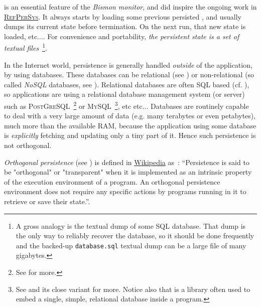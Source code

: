  is an essential feature of the
\emph{Bismon monitor}, and did inspire the ongoing work in
\href{http://refpersys.org/}{\textsc{RefPerSys}}.   It
always starts by loading some previous persisted ,
and usually dumps  its current state before
termination. On the next run, that new state is loaded, etc....  For
convenience and portability, \emph{the persistent state is a set of
  textual files}~\footnote{A gross analogy is the textual dump of some
  SQL database. That dump is the only way to reliably recover the
  database, so it should be done frequently and the backed-up
  \texttt{database.sql} textual dump can be a large file of many
  gigabytes.}.

In the Internet world, persistence is generally handled \emph{outside}
of the application, by using  databases. These
databases can be relational (see \cite{Date:2005:Database-in-Depth})
or non-relational (so called \emph{NoSQL} databases, see
\cite{RAJ-2018-NoSQL}). Relational databases are often SQL based
(cf. \cite{Date:2011:SQL-relth}), so applications are using a
relational database management system (or server) such as
\textsc{PostGreSQL}~\footnote{See  for
  more.} or \textsc{MySQL}~\footnote{See  and
  its close variant  for more. Notice also
  that  is a library often used to embed a
  single, simple, relational database inside a program.}, etc etc...
Databases are routinely capable to deal with a very large amount of
data (e.g. many terabytes or even petabytes), much more than the
available RAM, because the application using some database is
\emph{explicitly} fetching and updating only a tiny part of it. Hence
such persistence is not orthogonal.

\emph{Orthogonal persistence} 
 (see \cite{Dearle-2010-orthopersist})
is defined in
\href{https://en.wikipedia.org/wiki/Persistence\_(computer\_science)\#Orthogonal\_or\_transparent\_persistence}{Wikipedia} as~: ``Persistence is said to be "orthogonal" or "transparent" when it is
implemented as an intrinsic property of the execution environment of a
program. An orthogonal persistence environment does not require any
specific actions by programs running in it to retrieve or save their
state.''.

